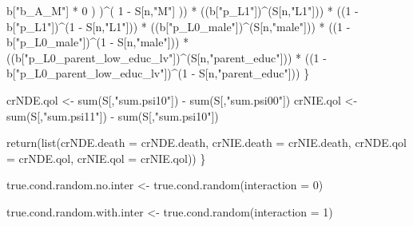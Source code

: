 \documentclass[
]{book}
\newenvironment{Shaded}{\begin{snugshade}}{\end{snugshade}}
\newcommand{\AttributeTok}[1]{\textcolor[rgb]{0.77,0.63,0.00}{#1}}
\newcommand{\DecValTok}[1]{\textcolor[rgb]{0.00,0.00,0.81}{#1}}
\newcommand{\FunctionTok}[1]{\textcolor[rgb]{0.00,0.00,0.00}{#1}}
\newcommand{\NormalTok}[1]{#1}
\newcommand{\OtherTok}[1]{\textcolor[rgb]{0.56,0.35,0.01}{#1}}
\newcommand{\SpecialCharTok}[1]{\textcolor[rgb]{0.00,0.00,0.00}{#1}}
\newcommand{\StringTok}[1]{\textcolor[rgb]{0.31,0.60,0.02}{#1}}
\begin{document}
\begin{Shaded}
\begin{Highlighting}[]
\NormalTok{                b[}\StringTok{"b\_A\_M"}\NormalTok{] }\SpecialCharTok{*} \DecValTok{0}\NormalTok{ ) )}\SpecialCharTok{\^{}}\NormalTok{( }\DecValTok{1} \SpecialCharTok{{-}}\NormalTok{ S[n,}\StringTok{"M"}\NormalTok{] )) }\SpecialCharTok{*}
\NormalTok{      ((b[}\StringTok{"p\_L1"}\NormalTok{])}\SpecialCharTok{\^{}}\NormalTok{(S[n,}\StringTok{"L1"}\NormalTok{])) }\SpecialCharTok{*}
\NormalTok{      ((}\DecValTok{1} \SpecialCharTok{{-}}\NormalTok{ b[}\StringTok{"p\_L1"}\NormalTok{])}\SpecialCharTok{\^{}}\NormalTok{(}\DecValTok{1} \SpecialCharTok{{-}}\NormalTok{ S[n,}\StringTok{"L1"}\NormalTok{])) }\SpecialCharTok{*}
\NormalTok{      ((b[}\StringTok{"p\_L0\_male"}\NormalTok{])}\SpecialCharTok{\^{}}\NormalTok{(S[n,}\StringTok{"male"}\NormalTok{])) }\SpecialCharTok{*} 
\NormalTok{      ((}\DecValTok{1} \SpecialCharTok{{-}}\NormalTok{ b[}\StringTok{"p\_L0\_male"}\NormalTok{])}\SpecialCharTok{\^{}}\NormalTok{(}\DecValTok{1} \SpecialCharTok{{-}}\NormalTok{ S[n,}\StringTok{"male"}\NormalTok{])) }\SpecialCharTok{*} 
\NormalTok{      ((b[}\StringTok{"p\_L0\_parent\_low\_educ\_lv"}\NormalTok{])}\SpecialCharTok{\^{}}\NormalTok{(S[n,}\StringTok{"parent\_educ"}\NormalTok{])) }\SpecialCharTok{*}
\NormalTok{      ((}\DecValTok{1} \SpecialCharTok{{-}}\NormalTok{ b[}\StringTok{"p\_L0\_parent\_low\_educ\_lv"}\NormalTok{])}\SpecialCharTok{\^{}}\NormalTok{(}\DecValTok{1} \SpecialCharTok{{-}}\NormalTok{ S[n,}\StringTok{"parent\_educ"}\NormalTok{])) }
\NormalTok{    \}}
  
\NormalTok{  crNDE.qol }\OtherTok{\textless{}{-}} \FunctionTok{sum}\NormalTok{(S[,}\StringTok{"sum.psi10"}\NormalTok{]) }\SpecialCharTok{{-}} \FunctionTok{sum}\NormalTok{(S[,}\StringTok{"sum.psi00"}\NormalTok{])}
\NormalTok{  crNIE.qol }\OtherTok{\textless{}{-}} \FunctionTok{sum}\NormalTok{(S[,}\StringTok{"sum.psi11"}\NormalTok{]) }\SpecialCharTok{{-}} \FunctionTok{sum}\NormalTok{(S[,}\StringTok{"sum.psi10"}\NormalTok{])}
  
  \FunctionTok{return}\NormalTok{(}\FunctionTok{list}\NormalTok{(}\AttributeTok{crNDE.death =}\NormalTok{ crNDE.death, }\AttributeTok{crNIE.death =}\NormalTok{ crNIE.death, }
              \AttributeTok{crNDE.qol =}\NormalTok{ crNDE.qol, }\AttributeTok{crNIE.qol =}\NormalTok{ crNIE.qol))}
\NormalTok{\}}
\end{Highlighting}
\end{Shaded}

\begin{Shaded}
\begin{Highlighting}[]
\NormalTok{true.cond.random.no.inter }\OtherTok{\textless{}{-}} \FunctionTok{true.cond.random}\NormalTok{(}\AttributeTok{interaction =} \DecValTok{0}\NormalTok{)}

\NormalTok{true.cond.random.with.inter }\OtherTok{\textless{}{-}} \FunctionTok{true.cond.random}\NormalTok{(}\AttributeTok{interaction =} \DecValTok{1}\NormalTok{)}
\end{Highlighting}
\end{Shaded}
\end{document}
